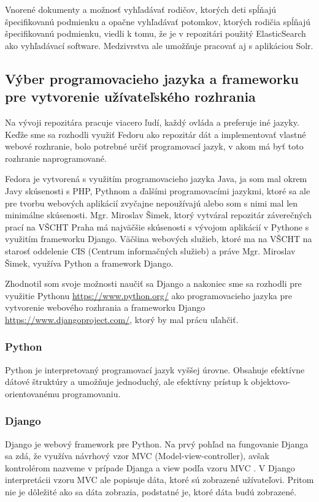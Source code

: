 \documentclass[thesis=M,slovak]{FITthesis}[2013/05/06]
\begin{document}
Vnorené dokumenty a možnosť vyhľadávať rodičov, ktorých deti spĺňajú špecifikovanú podmienku a opačne vyhľadávať potomkov, ktorých rodičia spĺňajú špecifikovanú podmienku, viedli k tomu, že je v repozitári použitý ElasticSearch ako vyhľadávací software. Medzivrstva ale umožňuje pracovať aj s aplikáciou Solr.

\subsection{Výber programovacieho jazyka a frameworku pre vytvorenie užívateľského rozhrania}
Na vývoji repozitára pracuje viacero ľudí, každý ovláda a preferuje iné jazyky. Keďže sme sa rozhodli využiť Fedoru ako repozitár dát a implementovať vlastné webové rozhranie, bolo potrebné určiť programovací jazyk, v akom má byť toto rozhranie naprogramované.

Fedora je vytvorená s využitím programovacieho jazyka Java, ja som mal okrem Javy skúsenosti s PHP, Pythnom a ďalšími programovacími jazykmi, ktoré sa ale pre tvorbu webových aplikácií zvyčajne nepoužívajú alebo som s nimi mal len minimálne skúsenosti. Mgr. Miroslav Šimek, ktorý vytváral repozitár záverečných prací na VŠCHT Praha má najväčšie skúsenosti s vývojom aplikácií v Pythone s využitím frameworku Django. Väčšina webových služieb, ktoré ma na VŠCHT na starosť oddelenie CIS (Centrum informačných služieb) a práve Mgr. Miroslav Šimek, využíva Python a framework Django.

Zhodnotil som svoje možnosti naučiť sa Django a nakoniec sme sa rozhodli pre využitie Pythonu \url{https://www.python.org/} ako programovacieho jazyka pre vytvorenie webového rozhrania a frameworku Django \url{https://www.djangoproject.com/}, ktorý by mal prácu uľahčiť.

\subsubsection{Python}
Python je interpretovaný programovací jazyk vyššej úrovne. Obsahuje efektívne dátové štruktúry a umožňuje jednoduchý, ale efektívny prístup k objektovo-orientovanému programovaniu. \cite{Python}

\subsubsection{Django}
Django je webový framework pre Python. Na prvý pohľad na fungovanie Djanga sa zdá, že využíva návrhový vzor MVC (Model-view-controller), avšak kontrolérom nazveme v prípade Djanga  a view podľa vzoru MVC . V Django interpretácii vzoru MVC ale  popisuje dáta, ktoré sú zobrazené užívateľovi. Pritom nie je dôležité ako sa dáta zobrazia, podstatné je, ktoré dáta budú zobrazené.
\end{document}
